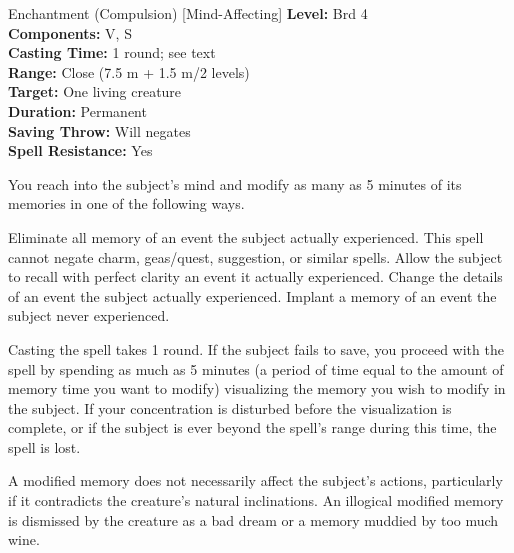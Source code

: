 {Enchantment (Compulsion) [Mind-Affecting]}
{
	\textbf{Level:}
	Brd 4\\
	\textbf{Components:}
	V, S\\
	\textbf{Casting Time:}
	1 round; see text\\
	\textbf{Range:}
	Close (7.5 m + 1.5 m/2 levels)\\
	\textbf{Target:}
	One living creature\\
	\textbf{Duration:}
	Permanent\\
	\textbf{Saving Throw:}
	Will negates\\
	\textbf{Spell Resistance:}
	Yes\\
}
{
	You reach into the subject's mind and modify as many as 5 minutes of its memories in one of the following ways.


Eliminate all memory of an event the subject actually experienced. This spell cannot negate charm, geas/quest, suggestion, or similar spells.
Allow the subject to recall with perfect clarity an event it actually experienced.
Change the details of an event the subject actually experienced.
Implant a memory of an event the subject never experienced.

	Casting the spell takes 1 round. If the subject fails to save, you proceed with the spell by spending as much as 5 minutes (a period of time equal to the amount of memory time you want to modify) visualizing the memory you wish to modify in the subject. If your concentration is disturbed before the visualization is complete, or if the subject is ever beyond the spell's range during this time, the spell is lost.

	A modified memory does not necessarily affect the subject's actions, particularly if it contradicts the creature's natural inclinations. An illogical modified memory is dismissed by the creature as a bad dream or a memory muddied by too much wine.

}
